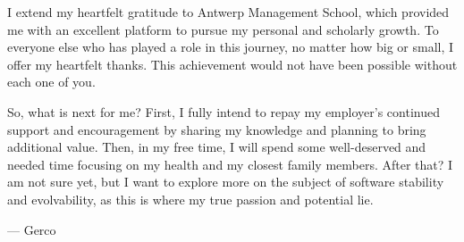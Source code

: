 I extend my heartfelt gratitude to Antwerp Management School, which provided me with an
excellent platform to pursue my personal and scholarly growth. To everyone else who has
played a role in this journey, no matter how big or small, I offer my heartfelt thanks.
This achievement would not have been possible without each one of you.

So, what is next for me? First, I fully intend to repay my employer's continued support
and encouragement by sharing my knowledge and planning to bring additional value. Then, in
my free time, I will spend some well-deserved and needed time focusing on my health and my
closest family members. After that? I am not sure yet, but I want to explore more on the
subject of software stability and evolvability, as this is where my true passion and
potential lie. 

\noindent --- Gerco